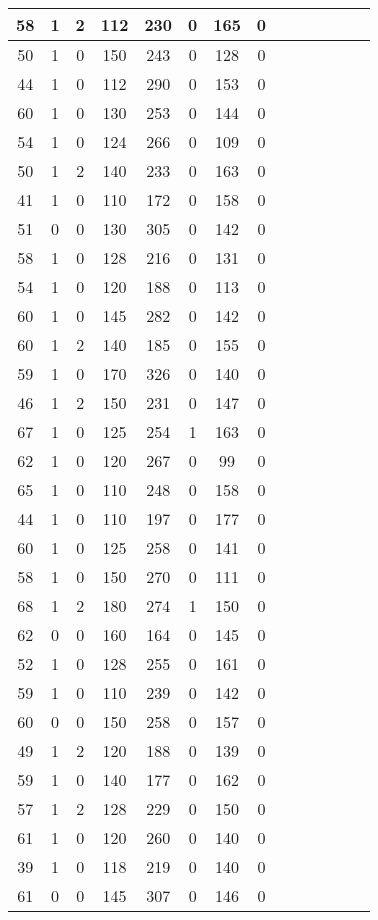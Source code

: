 \documentclass{article}
\begin{document}
\begin{longtable}{|c|c|c|c|c|c|c|c|c|c|c|c|c|c|}
\hline
58 & 1 & 2 & 112 & 230 & 0 & 165 & 0\\
\hline
50 & 1 & 0 & 150 & 243 & 0 & 128 & 0\\
\hline
44 & 1 & 0 & 112 & 290 & 0 & 153 & 0\\
\hline
60 & 1 & 0 & 130 & 253 & 0 & 144 & 0\\
\hline
54 & 1 & 0 & 124 & 266 & 0 & 109 & 0\\
\hline
50 & 1 & 2 & 140 & 233 & 0 & 163 & 0\\
\hline
41 & 1 & 0 & 110 & 172 & 0 & 158 & 0\\
\hline
51 & 0 & 0 & 130 & 305 & 0 & 142 & 0\\
\hline
58 & 1 & 0 & 128 & 216 & 0 & 131 & 0\\
\hline
54 & 1 & 0 & 120 & 188 & 0 & 113 & 0\\
\hline
60 & 1 & 0 & 145 & 282 & 0 & 142 & 0\\
\hline
60 & 1 & 2 & 140 & 185 & 0 & 155 & 0\\
\hline
59 & 1 & 0 & 170 & 326 & 0 & 140 & 0\\
\hline
46 & 1 & 2 & 150 & 231 & 0 & 147 & 0\\
\hline
67 & 1 & 0 & 125 & 254 & 1 & 163 & 0\\
\hline
62 & 1 & 0 & 120 & 267 & 0 & 99 & 0\\
\hline
65 & 1 & 0 & 110 & 248 & 0 & 158 & 0\\
\hline
44 & 1 & 0 & 110 & 197 & 0 & 177 & 0\\
\hline
60 & 1 & 0 & 125 & 258 & 0 & 141 & 0\\
\hline
58 & 1 & 0 & 150 & 270 & 0 & 111 & 0\\
\hline
68 & 1 & 2 & 180 & 274 & 1 & 150 & 0\\
\hline
62 & 0 & 0 & 160 & 164 & 0 & 145 & 0\\
\hline
52 & 1 & 0 & 128 & 255 & 0 & 161 & 0\\
\hline
59 & 1 & 0 & 110 & 239 & 0 & 142 & 0\\
\hline
60 & 0 & 0 & 150 & 258 & 0 & 157 & 0\\
\hline
49 & 1 & 2 & 120 & 188 & 0 & 139 & 0\\
\hline
59 & 1 & 0 & 140 & 177 & 0 & 162 & 0\\
\hline
57 & 1 & 2 & 128 & 229 & 0 & 150 & 0\\
\hline
61 & 1 & 0 & 120 & 260 & 0 & 140 & 0\\
\hline
39 & 1 & 0 & 118 & 219 & 0 & 140 & 0\\
\hline
61 & 0 & 0 & 145 & 307 & 0 & 146 & 0\\

\end{longtable}
\end{document}
